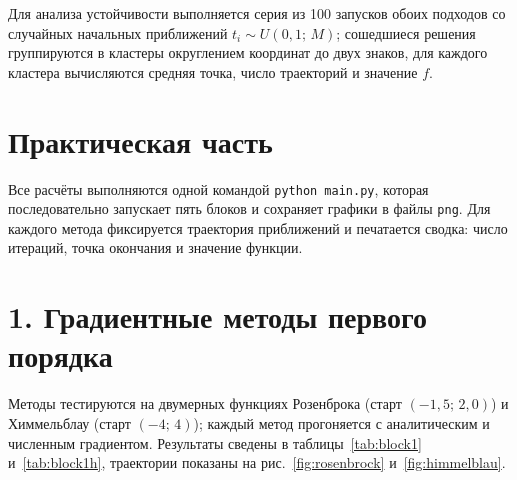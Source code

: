 \documentclass[a4paper]{article}
\newcommand{\mainsection}[1]{%
    \phantomsection
    \section*{\centering\fontsize{16pt}{0pt}\selectfont\textbf{#1}}%
}
\newcommand{\subsectiontext}[1]{%
    \section*{\fontsize{13pt}{0pt}\selectfont\textbf{#1}}%
}
\begin{document}
Для анализа устойчивости выполняется серия из 100 запусков обоих подходов со случайных начальных приближений $t_i \sim U(0{,}1;\, M)$; сошедшиеся решения группируются в кластеры округлением координат до двух знаков, для каждого кластера вычисляются средняя точка, число траекторий и значение $f$.

\newpage

\label{sec:practice}
\mainsection{Практическая часть}

Все расчёты выполняются одной командой \texttt{python main.py}, которая последовательно запускает пять блоков и сохраняет графики в файлы \texttt{png}. Для каждого метода фиксируется траектория приближений и печатается сводка: число итераций, точка окончания и значение функции.

\subsectiontext{1. Градиентные методы первого порядка}

Методы тестируются на двумерных функциях Розенброка (старт $(-1{,}5;\, 2{,}0)$) и Химмельблау (старт $(-4;\, 4)$); каждый метод прогоняется с аналитическим и численным градиентом. Результаты сведены в таблицы~\ref{tab:block1} и~\ref{tab:block1h}, траектории показаны на рис.~\ref{fig:rosenbrock} и~\ref{fig:himmelblau}.
\end{document}
